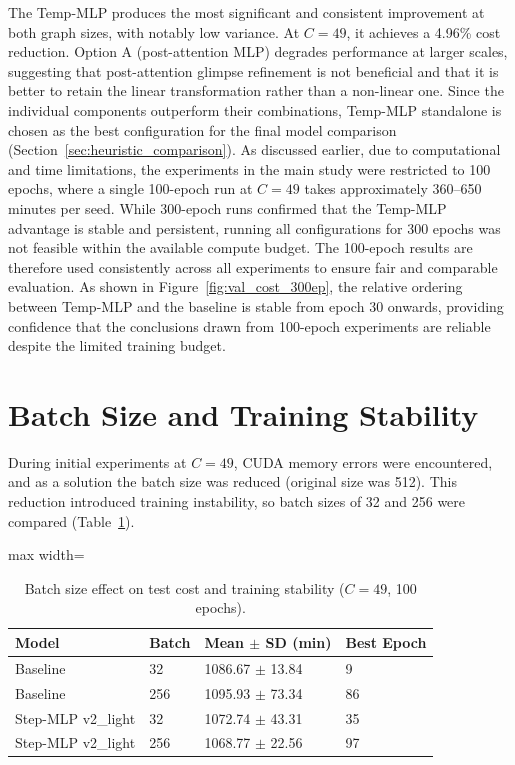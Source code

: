 The Temp-MLP produces the most significant and consistent improvement at both graph sizes,
with notably low variance. At $C = 49$, it achieves a 4.96\% cost reduction. Option A
(post-attention MLP) degrades performance at larger scales, suggesting that post-attention
glimpse refinement is not beneficial and that it is better to retain the linear transformation
rather than a non-linear one. Since the individual components outperform their combinations, Temp-MLP standalone is chosen
as the best configuration for the final model comparison (Section~\ref{sec:heuristic_comparison}).
As discussed earlier, due to computational and time limitations, the experiments in the main
study were restricted to 100 epochs, where a single 100-epoch run at $C = 49$ takes
approximately 360--650 minutes per seed. While 300-epoch runs confirmed that the Temp-MLP
advantage is stable and persistent, running all configurations for 300 epochs was not feasible
within the available compute budget. The 100-epoch results are therefore used consistently
across all experiments to ensure fair and comparable evaluation. As shown in
Figure~\ref{fig:val_cost_300ep}, the relative ordering between Temp-MLP and the baseline is
stable from epoch 30 onwards, providing confidence that the conclusions drawn from 100-epoch
experiments are reliable despite the limited training budget.

\section{Batch Size and Training Stability}
\label{sec:batch_size_stability}

During initial experiments at $C = 49$, CUDA memory errors were encountered, and as a
solution the batch size was reduced (original size was 512). This reduction introduced training instability, so
batch sizes of 32 and 256 were compared (Table~\ref{tab:batch_size}).

\begin{table}[H]
\centering
\caption{Batch size effect on test cost and training stability ($C = 49$, 100 epochs).}
\label{tab:batch_size}
\begin{adjustbox}{max width=\textwidth}
\begin{tabular}{llll}
\toprule
\textbf{Model} & \textbf{Batch} & \textbf{Mean $\pm$ SD (min)} & \textbf{Best Epoch} \\
\midrule
Baseline           & 32  & 1086.67 $\pm$ 13.84 & 9 \\
Baseline           & 256 & 1095.93 $\pm$ 73.34 & 86 \\
Step-MLP v2\_light & 32  & 1072.74 $\pm$ 43.31 & 35 \\
Step-MLP v2\_light & 256 & 1068.77 $\pm$ 22.56 & 97 \\
\bottomrule
\end{tabular}
\end{adjustbox}
\end{table}

